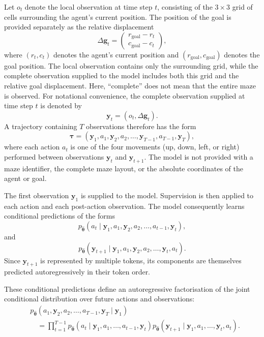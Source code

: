 ﻿\documentclass[12pt,a4paper]{article}
\theoremstyle{definition}
\begin{document}
Let $o_t$ denote the local observation at time step $t$, consisting of the $3 \times 3$
grid of cells surrounding the agent's current position. The position of the goal is
provided separately as the relative displacement
\begin{equation}
\Delta \mathbf{g}_t
=
\begin{pmatrix}
r_{\mathrm{goal}}-r_t \\
c_{\mathrm{goal}}-c_t
\end{pmatrix},
\end{equation}
where $(r_t,c_t)$ denotes the agent's current position and
$(r_{\mathrm{goal}},c_{\mathrm{goal}})$ denotes the goal position. The local observation
contains only the surrounding grid, while the complete observation supplied to the model
includes both this grid and the relative goal displacement. Here, ``complete'' does not
mean that the entire maze is observed. For notational
convenience, the complete observation supplied at time step $t$ is denoted by
\begin{equation}
\mathbf{y}_t=(o_t,\Delta \mathbf{g}_t).
\end{equation}
A trajectory containing $T$ observations therefore has the form
\begin{equation}
\boldsymbol{\tau}
=
(\mathbf{y}_1,a_1,\mathbf{y}_2,a_2,\dots,
\mathbf{y}_{T-1},a_{T-1},\mathbf{y}_T),
\end{equation}
where each action $a_t$ is one of the four movements (up, down, left, or right)
performed between observations $\mathbf{y}_t$ and $\mathbf{y}_{t+1}$. The model is
not provided with a maze identifier, the complete maze layout, or the absolute
coordinates of the agent or goal.

The first observation $\mathbf{y}_1$ is supplied to the model. Supervision is then
applied to each action and each post-action observation. The model consequently learns
conditional predictions of the forms
\begin{equation}
p_{\hat{\boldsymbol{\theta}}}
(a_t \mid \mathbf{y}_1,a_1,\mathbf{y}_2,a_2,\dots,
a_{t-1},\mathbf{y}_t),
\end{equation}
and
\begin{equation}
p_{\hat{\boldsymbol{\theta}}}
(\mathbf{y}_{t+1} \mid \mathbf{y}_1,a_1,\mathbf{y}_2,a_2,\dots,
\mathbf{y}_t,a_t).
\end{equation}
Since $\mathbf{y}_{t+1}$ is represented by multiple tokens, its components are
themselves predicted autoregressively in their token order.

These conditional predictions define an autoregressive factorisation of the joint
conditional distribution over future actions and observations:
\begin{equation}
\begin{split}
&p_{\hat{\boldsymbol{\theta}}}
(a_1,\mathbf{y}_2,a_2,\dots,a_{T-1},\mathbf{y}_T
\mid \mathbf{y}_1) \\
&\quad =
\prod_{t=1}^{T-1}
p_{\hat{\boldsymbol{\theta}}}
(a_t \mid \mathbf{y}_1,a_1,\dots,a_{t-1},\mathbf{y}_t)
p_{\hat{\boldsymbol{\theta}}}
(\mathbf{y}_{t+1} \mid \mathbf{y}_1,a_1,\dots,\mathbf{y}_t,a_t).
\end{split}
\end{equation}
\end{document}
